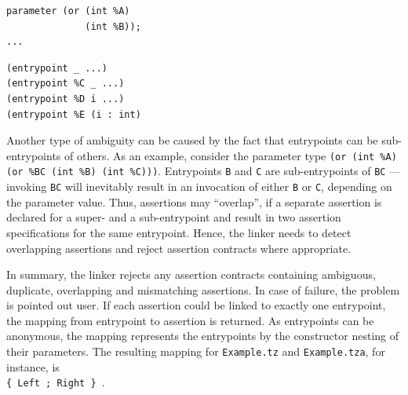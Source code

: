 \vspace{\baselineskip}
\noindent
\begin{minipage}{.4\textwidth}
\begin{lstlisting}[label=lst:ambiguity_parent, numbers=none, language=Michelson, caption=Example2.tz]
parameter (or (int %A)
              (int %B));
...
\end{lstlisting}
\end{minipage}\hfill
\begin{minipage}{.5\textwidth}
\begin{lstlisting}[label=lst:ambiguity_assertion, language=Assertion, caption=Ambiguous assertions for Example2.tz]
(entrypoint _ ...)
(entrypoint %C _ ...)
(entrypoint %D i ...)
(entrypoint %E (i : int)
\end{lstlisting}
\end{minipage}
\vspace{\baselineskip}

Another type of ambiguity can be caused by the fact that entrypoints can be sub-entrypoints of others. As an example, consider the parameter type \texttt{(or (int \%A) (or \%BC (int \%B) (int \%C)))}. Entrypoints \texttt{B} and \texttt{C} are sub-entrypoints of \texttt{BC} --- invoking \texttt{BC} will inevitably result in an invocation of either \texttt{B} or \texttt{C}, depending on the parameter value. Thus, assertions may ``overlap'', if a separate assertion is declared for a super- and a sub-entrypoint and result in two assertion specifications for the same entrypoint. Hence, the linker needs to detect overlapping assertions and reject assertion contracts where appropriate.

In summary, the linker rejects any assertion contracts containing ambiguous, duplicate, overlapping and mismatching assertions. In case of failure, the problem is pointed out user. If each assertion could be linked to exactly one entrypoint, the mapping from entrypoint to assertion is returned. As entrypoints can be anonymous, the mapping represents the entrypoints by the constructor nesting of their parameters. The resulting mapping for \texttt{Example.tz} and \texttt{Example.tza}, for instance, is \\
\texttt{\{ Left ; Right \} }.

